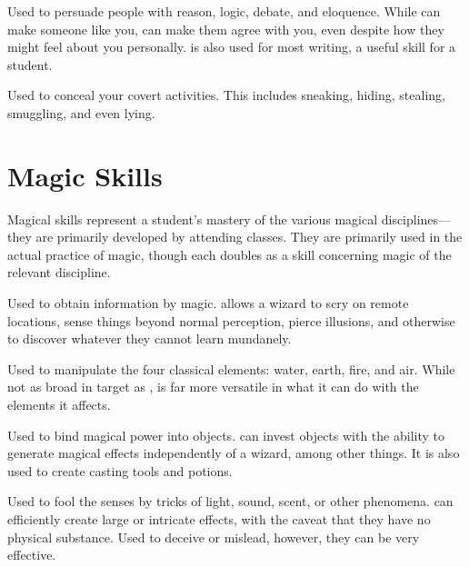 
Used to persuade people with reason, logic, debate, and eloquence.
While  can make someone like you,  can make them agree with you, even despite how they might feel about you personally.
 is also used for most writing, a useful skill for a student.


Used to conceal your covert activities.
This includes sneaking, hiding, stealing, smuggling, and even lying.

\section{Magic Skills}

Magical skills represent a student's mastery of the various magical disciplines---they are primarily developed by attending classes.
They are primarily used in the actual practice of magic, though each doubles as a  skill concerning magic of the relevant discipline.


Used to obtain information by magic.
 allows a wizard to scry on remote locations, sense things beyond normal perception, pierce illusions, and otherwise to discover whatever they cannot learn mundanely.


Used to manipulate the four classical elements: water, earth, fire, and air.
While not as broad in target as ,  is far more versatile in what it can do with the elements it affects.


Used to bind magical power into objects.
 can invest objects with the ability to generate magical effects independently of a wizard, among other things.
It is also used to create casting tools and potions.


Used to fool the senses by tricks of light, sound, scent, or other phenomena.
 can efficiently create large or intricate effects, with the caveat that they have no physical substance.
Used to deceive or mislead, however, they can be very effective.

